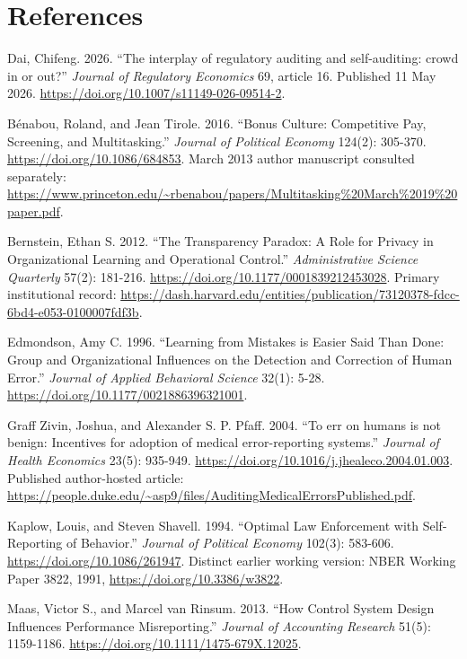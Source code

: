 \documentclass[
  11pt,
]{article}
\begin{document}
{
\small
\setlength{\parindent}{0pt}
\section*{References}\label{references}

Dai, Chifeng. 2026. ``The interplay of regulatory auditing and
self-auditing: crowd in or out?'' \emph{Journal of Regulatory Economics}
69, article 16. Published 11 May 2026.
\url{https://doi.org/10.1007/s11149-026-09514-2}.

Bénabou, Roland, and Jean Tirole. 2016. ``Bonus Culture: Competitive
Pay, Screening, and Multitasking.'' \emph{Journal of Political Economy}
124(2): 305-370. \url{https://doi.org/10.1086/684853}. March 2013 author
manuscript consulted separately:
\url{https://www.princeton.edu/~rbenabou/papers/Multitasking\%20March\%2019\%20paper.pdf}.

Bernstein, Ethan S. 2012. ``The Transparency Paradox: A Role for Privacy
in Organizational Learning and Operational Control.''
\emph{Administrative Science Quarterly} 57(2): 181-216.
\url{https://doi.org/10.1177/0001839212453028}. Primary institutional
record:
\url{https://dash.harvard.edu/entities/publication/73120378-fdcc-6bd4-e053-0100007fdf3b}.

Edmondson, Amy C. 1996. ``Learning from Mistakes is Easier Said Than
Done: Group and Organizational Influences on the Detection and
Correction of Human Error.'' \emph{Journal of Applied Behavioral
Science} 32(1): 5-28. \url{https://doi.org/10.1177/0021886396321001}.

Graff Zivin, Joshua, and Alexander S. P. Pfaff. 2004. ``To err on humans
is not benign: Incentives for adoption of medical error-reporting
systems.'' \emph{Journal of Health Economics} 23(5): 935-949.
\url{https://doi.org/10.1016/j.jhealeco.2004.01.003}. Published
author-hosted article:
\url{https://people.duke.edu/~asp9/files/AuditingMedicalErrorsPublished.pdf}.

Kaplow, Louis, and Steven Shavell. 1994. ``Optimal Law Enforcement with
Self-Reporting of Behavior.'' \emph{Journal of Political Economy}
102(3): 583-606. \url{https://doi.org/10.1086/261947}. Distinct earlier
working version: NBER Working Paper 3822, 1991,
\url{https://doi.org/10.3386/w3822}.

Maas, Victor S., and Marcel van Rinsum. 2013. ``How Control System
Design Influences Performance Misreporting.'' \emph{Journal of
Accounting Research} 51(5): 1159-1186.
\url{https://doi.org/10.1111/1475-679X.12025}.

}
\end{document}
